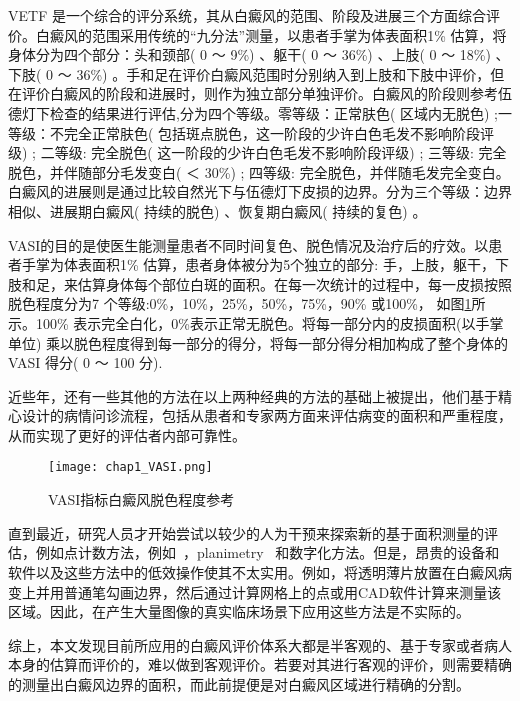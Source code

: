VETF 是一个综合的评分系统，其从白癜风的范围、阶段及进展三个方面综合评价。白癜风的范围采用传统的“九分法”测量，以患者手掌为体表面积1\% 估算，将身体分为四个部分：头和颈部( 0 ～ 9\%) 、躯干( 0 ～ 36\%) 、上肢( 0 ～ 18\%) 、下肢( 0 ～ 36\%) 。手和足在评价白癜风范围时分别纳入到上肢和下肢中评价，但在评价白癜风的阶段和进展时，则作为独立部分单独评价。白癜风的阶段则参考伍德灯下检查的结果进行评估,分为四个等级。零等级：正常肤色( 区域内无脱色) ;一等级：不完全正常肤色( 包括斑点脱色，这一阶段的少许白色毛发不影响阶段评级) ; 二等级: 完全脱色( 这一阶段的少许白色毛发不影响阶段评级) ; 三等级: 完全脱色，并伴随部分毛发变白( ＜ 30\%) ; 四等级: 完全脱色，并伴随毛发完全变白。%
白癜风的进展则是通过比较自然光下与伍德灯下皮损的边界。分为三个等级：边界相似、进展期白癜风( 持续的脱色) 、恢复期白癜风( 持续的复色) 。

VASI的目的是使医生能测量患者不同时间复色、脱色情况及治疗后的疗效。以患者手掌为体表面积1\% 估算，患者身体被分为5个独立的部分: 手，上肢，躯干，下肢和足，来估算身体每个部位白斑的面积。在每一次统计的过程中，每一皮损按照脱色程度分为7 个等级:0\%，10\%，25\%，50\%，75\%，90\% 或100\%， 如图\ref{fig:chap1_VASI}所示。100\% 表示完全白化，0\%表示正常无脱色。将每一部分内的皮损面积(以手掌单位) 乘以脱色程度得到每一部分的得分，将每一部分得分相加构成了整个身体的VASI 得分( 0 ～ 100 分).

近些年，还有一些其他的方法在以上两种经典的方法的基础上被提出，他们基于精心设计的病情问诊流程，包括从患者和专家两方面来评估病变的面积和严重程度，从而实现了更好的评估者内部可靠性\cite{feily2014vitiligo,van2016development}。
\begin{figure}[htbp]
\begin{center}
\texttt{[image: chap1\_VASI.png]}
\end{center}
\caption{VASI指标白癜风脱色程度参考}
\label{fig:chap1_VASI}
\end{figure}
直到最近，研究人员才开始尝试以较少的人为干预来探索新的基于面积测量的评估，例如点计数方法，例如~\cite{aydin2007practical}，planimetry~ \cite {aydin2007practical}和数字化方法\cite {marrakchi2008objective, verma2015evaluation}。但是，昂贵的设备和软件以及这些方法中的低效操作使其不太实用。例如，将透明薄片放置在白癜风病变上并用普通笔勾画边界，然后通过计算网格上的点或用CAD软件计算来测量该区域。因此，在产生大量图像的真实临床场景下应用这些方法是不实际的。

综上，本文发现目前所应用的白癜风评价体系大都是半客观的、基于专家或者病人本身的估算而评价的，难以做到客观评价。若要对其进行客观的评价，则需要精确的测量出白癜风边界的面积，而此前提便是对白癜风区域进行精确的分割。

